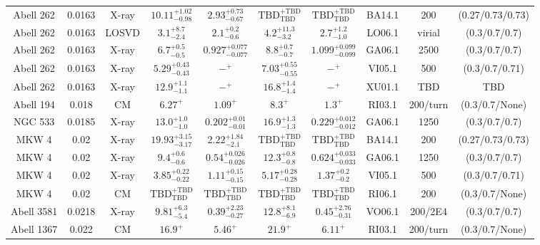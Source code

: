 \begin{table}
\begin{tabular}{cccccccccc}
Abell 262 & 0.0163 & X-ray & ${10.11}^{+1.02}_{-0.98}$ & ${2.93}^{+0.73}_{-0.67}$ & ${\mathrm{TBD}}^{+\mathrm{TBD}}_{\mathrm{TBD}}$ & ${\mathrm{TBD}}^{+\mathrm{TBD}}_{\mathrm{TBD}}$ & BA14.1 & 200 & (0.27/0.73/0.73) \\
Abell 262 & 0.0163 & LOSVD & ${3.1}^{+8.7}_{-2.4}$ & ${2.1}^{+0.2}_{-0.6}$ & ${4.2}^{+11.3}_{-3.2}$ & ${2.7}^{+1.2}_{-1.0}$ & LO06.1 & virial & (0.3/0.7/0.7) \\
Abell 262 & 0.0163 & X-ray & ${6.7}^{+0.5}_{-0.5}$ & ${0.927}^{+0.077}_{-0.077}$ & ${8.8}^{+0.7}_{-0.7}$ & ${1.099}^{+0.099}_{-0.099}$ & GA06.1 & 2500 & (0.3/0.7/0.7) \\
Abell 262 & 0.0163 & X-ray & ${5.29}^{+0.43}_{-0.43}$ & ${-}^{+}_{}$ & ${7.03}^{+0.55}_{-0.55}$ & ${-}^{+}_{}$ & VI05.1 & 500 & (0.3/0.7/0.71) \\
Abell 262 & 0.0163 & X-ray & ${12.9}^{+1.1}_{-1.1}$ & ${-}^{+}_{}$ & ${16.8}^{+1.4}_{-1.4}$ & ${-}^{+}_{}$ & XU01.1 & TBD & TBD \\
Abell 194 & 0.018 & CM & ${6.27}^{+}_{}$ & ${1.09}^{+}_{}$ & ${8.3}^{+}_{}$ & ${1.3}^{+}_{}$ & RI03.1 & 200/turn & (0.3/0.7/None) \\
NGC 533 & 0.0185 & X-ray & ${13.0}^{+1.0}_{-1.0}$ & ${0.202}^{+0.01}_{-0.01}$ & ${16.9}^{+1.3}_{-1.3}$ & ${0.229}^{+0.012}_{-0.012}$ & GA06.1 & 1250 & (0.3/0.7/0.7) \\
MKW 4 & 0.02 & X-ray & ${19.93}^{+3.15}_{-3.17}$ & ${2.22}^{+1.84}_{-2.1}$ & ${\mathrm{TBD}}^{+\mathrm{TBD}}_{\mathrm{TBD}}$ & ${\mathrm{TBD}}^{+\mathrm{TBD}}_{\mathrm{TBD}}$ & BA14.1 & 200 & (0.27/0.73/0.73) \\
MKW 4 & 0.02 & X-ray & ${9.4}^{+0.6}_{-0.6}$ & ${0.54}^{+0.026}_{-0.026}$ & ${12.3}^{+0.8}_{-0.8}$ & ${0.624}^{+0.033}_{-0.033}$ & GA06.1 & 1250 & (0.3/0.7/0.7) \\
MKW 4 & 0.02 & X-ray & ${3.85}^{+0.22}_{-0.22}$ & ${1.11}^{+0.15}_{-0.15}$ & ${5.17}^{+0.28}_{-0.28}$ & ${1.37}^{+0.2}_{-0.2}$ & VI05.1 & 500 & (0.3/0.7/0.71) \\
MKW 4 & 0.02 & CM & ${\mathrm{TBD}}^{+\mathrm{TBD}}_{\mathrm{TBD}}$ & ${\mathrm{TBD}}^{+\mathrm{TBD}}_{\mathrm{TBD}}$ & ${\mathrm{TBD}}^{+\mathrm{TBD}}_{\mathrm{TBD}}$ & ${\mathrm{TBD}}^{+\mathrm{TBD}}_{\mathrm{TBD}}$ & RI06.1 & 200 & (0.3/0.7/None) \\
Abell 3581 & 0.0218 & X-ray & ${9.81}^{+6.3}_{-5.4}$ & ${0.39}^{+2.23}_{-0.27}$ & ${12.8}^{+8.1}_{-6.9}$ & ${0.45}^{+2.76}_{-0.31}$ & VO06.1 & 200/2E4 & (0.3/0.7/0.7) \\
Abell 1367 & 0.022 & CM & ${16.9}^{+}_{}$ & ${5.46}^{+}_{}$ & ${21.9}^{+}_{}$ & ${6.11}^{+}_{}$ & RI03.1 & 200/turn & (0.3/0.7/None) \\

\end{tabular}
\end{table}
